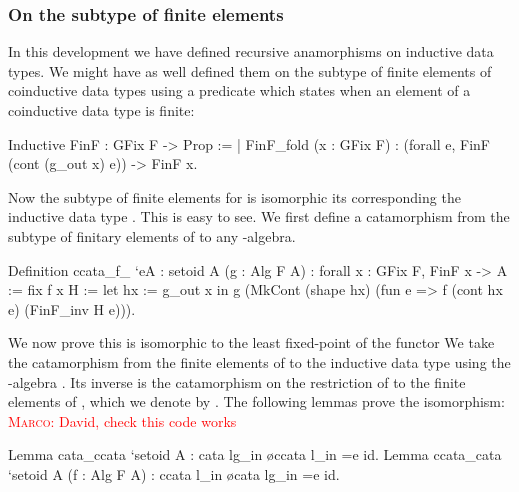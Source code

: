 \documentclass[anonymous, a4paper, UKenglish, cleveref, autoref, thm-restate]{lipics-v2021}
\newcommand{\mpav}[1]{\textcolor{red}{\textsc{Marco}: #1}}
\newcommand{\dcas}[1]{\textcolor{ForestGreen}{\textsc{David}: #1}}
\begin{document}
\subsubsection{On the subtype of finite elements}
In this development we have defined recursive anamorphisms on inductive data
types.  We might have as well defined them on the subtype of finite elements of
coinductive data types using a predicate which states when an element of a
coinductive data type is finite:
\begin{coqcode}
Inductive FinF : GFix F -> Prop :=
| FinF_fold (x : GFix F) : (forall e, FinF (cont (g_out x) e)) -> FinF x.
\end{coqcode}
Now the subtype  of finite elements for 
is isomorphic its corresponding the inductive data type . This is
easy to see. We first define a catamorphism  from the
subtype  of finitary elements of  to
any -algebra.
\begin{coqcode}
Definition ccata_f_ `{eA : setoid A} (g : Alg F A)
  : forall x : GFix F, FinF x -> A := fix f x H :=
    let hx := g_out x in
      g (MkCont (shape hx) (fun e => f (cont hx e) (FinF_inv H e))).
\end{coqcode}
We now prove this is isomorphic to the least fixed-point of the functor 
We take the catamorphism from the finite elements of  to the
inductive data type  using the -algebra . Its inverse is the catamorphism on the restriction of  to the finite elements of , which we denote by .
The following lemmas prove the isomorphism:
\mpav{David, check this code works}
\begin{coqcode}
Lemma cata_ccata `{setoid A} : cata lg_in \o ccata l_in =e id.
Lemma ccata_cata `{setoid A} (f : Alg F A) : ccata l_in \o cata lg_in =e id.
\end{coqcode}


\end{document}
